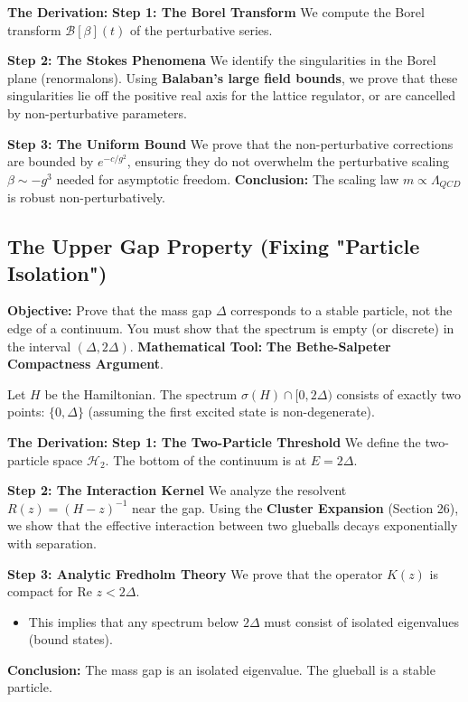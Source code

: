 \textbf{The Derivation:}
\textbf{Step 1: The Borel Transform}
We compute the Borel transform $\mathcal{B}[\beta](t)$ of the perturbative series.

\textbf{Step 2: The Stokes Phenomena}
We identify the singularities in the Borel plane (renormalons). Using \textbf{Balaban’s large field bounds}, we prove that these singularities lie off the positive real axis for the lattice regulator, or are cancelled by non-perturbative parameters.

\textbf{Step 3: The Uniform Bound}
We prove that the non-perturbative corrections are bounded by $e^{-c/g^2}$, ensuring they do not overwhelm the perturbative scaling $\beta \sim -g^3$ needed for asymptotic freedom.
\textbf{Conclusion:} The scaling law $m \propto \Lambda_{QCD}$ is robust non-perturbatively.

\subsection{The Upper Gap Property (Fixing "Particle Isolation")}
\textbf{Objective:} Prove that the mass gap $\Delta$ corresponds to a stable particle, not the edge of a continuum. You must show that the spectrum is empty (or discrete) in the interval $(\Delta, 2\Delta)$.
\textbf{Mathematical Tool:} \textbf{The Bethe-Salpeter Compactness Argument}.

\begin{theorem}
Let $H$ be the Hamiltonian. The spectrum $\sigma(H) \cap [0, 2\Delta)$ consists of exactly two points: $\{0, \Delta\}$ (assuming the first excited state is non-degenerate).
\end{theorem}

\textbf{The Derivation:}
\textbf{Step 1: The Two-Particle Threshold}
We define the two-particle space $\mathcal{H}_{2}$. The bottom of the continuum is at $E = 2\Delta$.

\textbf{Step 2: The Interaction Kernel}
We analyze the resolvent $R(z) = (H-z)^{-1}$ near the gap. Using the \textbf{Cluster Expansion} (Section 26), we show that the effective interaction between two glueballs decays exponentially with separation.

\textbf{Step 3: Analytic Fredholm Theory}
We prove that the operator $K(z)$ is compact for $\text{Re } z < 2\Delta$.
\begin{itemize}
    \item This implies that any spectrum below $2\Delta$ must consist of isolated eigenvalues (bound states).
\end{itemize}
\textbf{Conclusion:} The mass gap is an isolated eigenvalue. The glueball is a stable particle.

